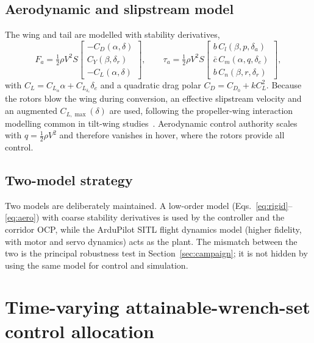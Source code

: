 \documentclass[preprint,3p,11pt]{elsarticle}
\begin{document}
\subsection{Aerodynamic and slipstream model}\label{sec:aero}
The wing and tail are modelled with stability derivatives,
\begin{equation}
F_a=\tfrac12\rho V^2 S
 \begin{bmatrix} -C_D(\alpha,\delta)\\ C_Y(\beta,\delta_r)\\ -C_L(\alpha,\delta)\end{bmatrix},
\qquad
\tau_a=\tfrac12\rho V^2 S
 \begin{bmatrix} b\, C_l(\beta,p,\delta_a)\\ \bar c\, C_m(\alpha,q,\delta_e)\\ b\, C_n(\beta,r,\delta_r)\end{bmatrix},
\label{eq:aero}
\end{equation}
with $C_L=C_{L_\alpha}\alpha+C_{L_{\delta_e}}\delta_e$ and a quadratic drag
polar $C_D=C_{D_0}+k C_L^2$. Because the rotors blow the wing during
conversion, an effective slipstream velocity and an augmented
$C_{L,\max}(\delta)$ are used, following the propeller-wing interaction
modelling common in tilt-wing studies~\cite{rohr2021nmpc,mancinelli2025unified}.
Aerodynamic control authority scales with $q=\tfrac12\rho V^2$ and therefore
vanishes in hover, where the rotors provide all control.

\subsection{Two-model strategy}\label{sec:twomodel}
Two models are deliberately maintained. A low-order model
(Eqs.~\eqref{eq:rigid}--\eqref{eq:aero}) with coarse stability derivatives is
used by the controller and the corridor OCP, while the ArduPilot SITL flight
dynamics model (higher fidelity, with motor and servo dynamics) acts as the
plant. The mismatch between the two is the principal robustness test in
Section~\ref{sec:campaign}; it is not hidden by using the same model for
control and simulation.

\section{Time-varying attainable-wrench-set control allocation}\label{sec:aws}
\end{document}
